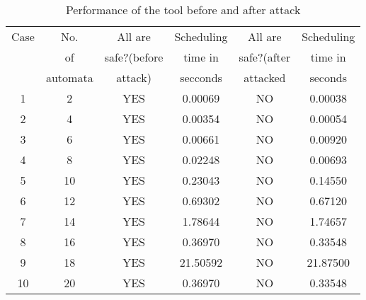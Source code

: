 \begin{table}[ht]
\caption{Performance of the tool before and after attack}
\centering
\begin{tabular}{|c | c | c | c | c | c|}
\hline %
Case & No.           &  All are        & Scheduling   & All are       &Scheduling  \\       
     & of            &  safe?(before   & time in      & safe?(after   &time in            \\  
     & automata      &  attack)        & secconds     & attacked      &seconds    \\
\hline
\hline
1 & 2 & YES & 0.00069 & NO & 0.00038\\

2 & 4  & YES & 0.00354 & NO &  0.00054 \\

3 & 6  & YES & 0.00661 & NO & 0.00920 \\

4 & 8 & YES &  0.02248 & NO & 0.00693 \\

5 & 10 & YES & 0.23043 & NO & 0.14550 \\

6 & 12 & YES & 0.69302 & NO & 0.67120 \\

7 & 14 & YES & 1.78644 & NO & 1.74657 \\

8 & 16 & YES & 0.36970 & NO & 0.33548 \\

9 & 18 & YES & 21.50592 & NO & 21.87500 \\

10 & 20 & YES & 0.36970 & NO & 0.33548 \\




\hline

\end{tabular}
\label{table:nonlin}

\end{table}


